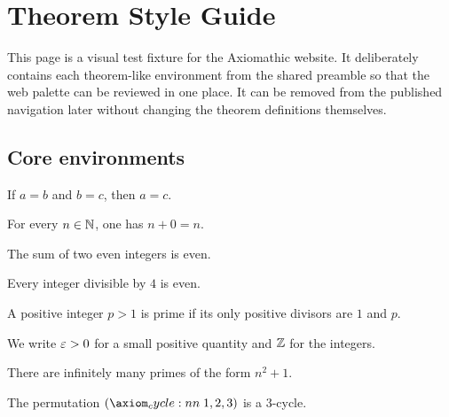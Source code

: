 \documentclass[../../Axiomathic.tex]{subfiles}
\begin{document}
\graphicspath{{sections/style/images/}{images/}}

\chapter{Theorem Style Guide}

This page is a visual test fixture for the Axiomathic website. It deliberately
contains each theorem-like environment from the shared preamble so that the web
palette can be reviewed in one place. It can be removed from the published
navigation later without changing the theorem definitions themselves.

\section{Core environments}

\begin{theorem}
If $a=b$ and $b=c$, then $a=c$.
\end{theorem}

\begin{lemma}
For every $n\in\mathbb N$, one has $n+0=n$.
\end{lemma}

\begin{prop}
The sum of two even integers is even.
\end{prop}

\begin{corollary}
Every integer divisible by $4$ is even.
\end{corollary}

\begin{defn}
A positive integer $p>1$ is prime if its only positive divisors are $1$ and $p$.
\end{defn}

\begin{nota}
We write $\varepsilon>0$ for a small positive quantity and $\mathbb Z$ for the integers.
\end{nota}

\begin{conj}
There are infinitely many primes of the form $n^2+1$.
\end{conj}

\begin{example}
The permutation $\cycle{1,2,3}$ is a $3$-cycle.
\end{example}
\end{document}
